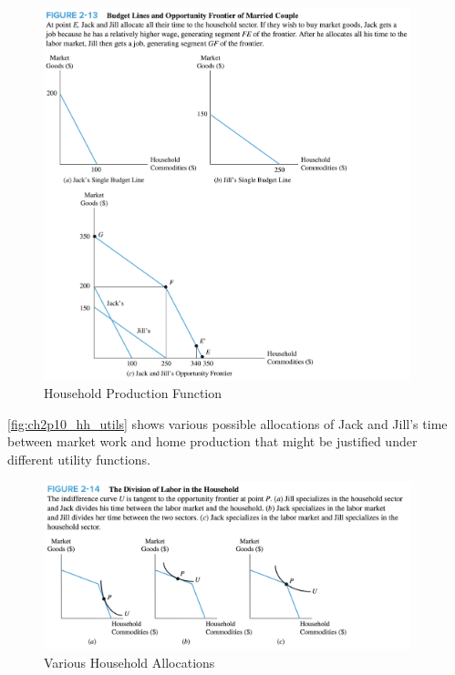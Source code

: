 \begin{figure}[!htb]
    \centering
        \includegraphics[width=0.95\textwidth]{../input/ch_2p10_hh_prod.png}
    \caption{Household Production Function}
    \label{fig:ch2p10_hh_prod}
\end{figure}

\FloatBarrier

\autoref{fig:ch2p10_hh_utils} shows various 
possible allocations of Jack and Jill's
time between market work and home production that 
might be justified under different 
utility functions.

\FloatBarrier

\begin{figure}[!htb]
    \centering
        \includegraphics[width=0.95\textwidth]{../input/ch_2p10_hh_utils.png}
    \caption{Various Household Allocations}
    \label{fig:ch2p10_hh_utils}
\end{figure}

